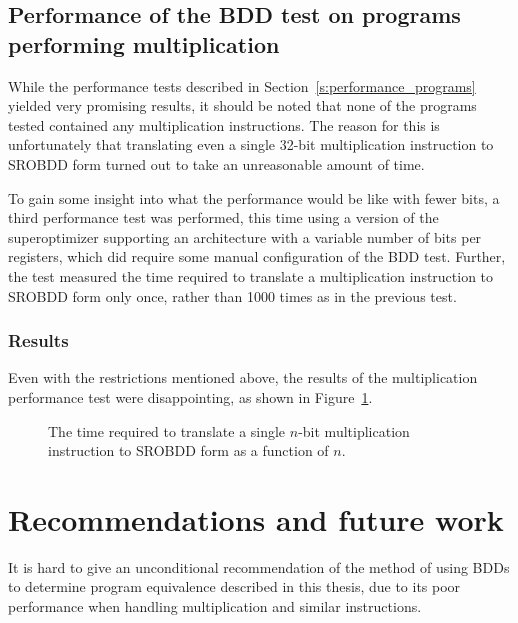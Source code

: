 \documentclass[a4paper,11pt]{kth-mag}
\begin{document}

\section{Performance of the BDD test on programs performing multiplication}
\label{s:performance_mul}

While the performance tests described in Section~\ref{s:performance_programs} yielded very promising results, it should be noted that none of the programs tested contained any multiplication instructions.
The reason for this is unfortunately that translating even a single 32-bit multiplication instruction to SROBDD form turned out to take an unreasonable amount of time.

To gain some insight into what the performance would be like with fewer bits, a third performance test was performed, this time using a version of the superoptimizer supporting an architecture with a variable number of bits per registers, which did require some manual configuration of the BDD test.
Further, the test measured the time required to translate a multiplication instruction to SROBDD form only once, rather than 1000 times as in the previous test.

\subsection{Results}

Even with the restrictions mentioned above, the results of the multiplication performance test were disappointing, as shown in Figure~\ref{fig:performance_mul}.

\begin{figure}
\centering

\caption{The time required to translate a single $n$-bit multiplication instruction to SROBDD form as a function of $n$.}
\label{fig:performance_mul}
\end{figure}


\chapter{Recommendations and future work}
\label{ch:recommendations_future_work}

It is hard to give an unconditional recommendation of the method of using BDDs to determine program equivalence described in this thesis, due to its poor performance when handling multiplication and similar instructions.
\end{document}
